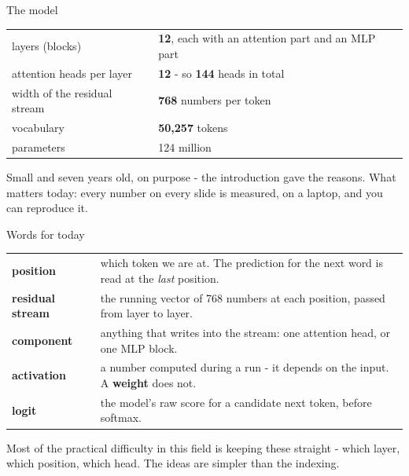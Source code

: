 \documentclass[aspectratio=169]{beamer}
\newcommand{\watchbox}[1]{%
  \begin{tcolorbox}[colback=armorange!12, colframe=armorange, boxrule=0.6pt, arc=2pt]
  #1
  \end{tcolorbox}}
\begin{document}
\begin{frame}{The model}
  \vspace{0.6em}
  \begin{center}
  \begin{tabular}{@{}ll@{}}
    \toprule
    layers (blocks) & \textbf{12}, each with an attention part and an MLP part\\
    attention heads per layer & \textbf{12} - so \textbf{144} heads in total\\
    width of the residual stream & \textbf{768} numbers per token\\
    vocabulary & \textbf{50{,}257} tokens\\
    parameters & 124 million\\
    \bottomrule
  \end{tabular}
  \end{center}

  \vspace{0.8em}
  Small and seven years old, on purpose - the introduction gave the reasons. What matters today:
  every number on every slide is measured, on a laptop, and you can reproduce it.
\end{frame}

\begin{frame}{Words for today}
  \vspace{0.3em}
  \begin{center}
  \small
  \begin{tabular}{@{}p{}p{}@{}}
    \toprule
    \textbf{position} & which token we are at. The prediction for the next word is read at the
      \emph{last} position.\\[0.2em]
    \textbf{residual stream} & the running vector of 768 numbers at each position, passed from
      layer to layer.\\[0.2em]
    \textbf{component} & anything that writes into the stream: one attention head, or one MLP
      block.\\[0.2em]
    \textbf{activation} & a number computed during a run - it depends on the input. A
      \textbf{weight} does not.\\[0.2em]
    \textbf{logit} & the model's raw score for a candidate next token, before softmax.\\
    \bottomrule
  \end{tabular}
  \end{center}

  \vspace{0.6em}
  \watchbox{\small Most of the practical difficulty in this field is keeping these straight -
  which layer, which position, which head. The ideas are simpler than the indexing.}
\end{frame}
\end{document}
